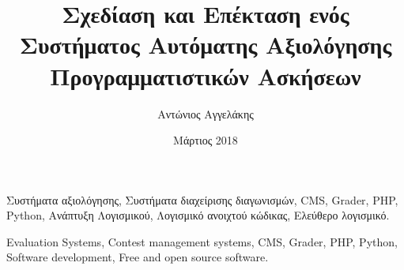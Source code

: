 \documentclass[diploma]{softlab-thesis}
\begin{document}

\frontmatter

\title{Σχεδίαση και Επέκταση ενός Συστήματος Αυτόματης Αξιολόγησης Προγραμματιστικών Ασκήσεων}
\author{Αντώνιος Αγγελάκης}
\date{Μάρτιος 2018}




\maketitle



\begin{abstractgr}%

\begin{keywordsgr}
Συστήματα αξιολόγησης, Συστήματα διαχείρισης διαγωνισμών, CMS, Grader, PHP,
Python, Ανάπτυξη Λογισμικού, Λογισμικό ανοιχτού κώδικας, Ελεύθερο λογισμικό.
\end{keywordsgr}
\end{abstractgr}



\begin{abstracten}%

\begin{keywordsen}
Evaluation Systems, Contest management systems, CMS, Grader, PHP, Python,
Software development, Free and open source software.
\end{keywordsen}
\end{abstracten}



\begin{acknowledgementsgr}
\end{acknowledgementsgr}



\tableofcontents
\listoftables
\listoffigures
\lstlistoflistings
\end{document}
